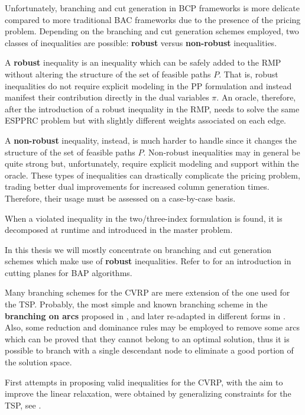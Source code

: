 \medskip

Unfortunately, branching and cut generation in BCP frameworks is more delicate compared to more traditional BAC frameworks due to the presence of the pricing problem.
Depending on the branching and cut generation schemes employed, two classes of inequalities are possible: \textbf{robust} versus \textbf{non-robust} inequalities.

A \textbf{robust} inequality is an inequality which can be safely added to the RMP without altering the structure of the set of feasible paths $P$.
That is, robust inequalities do not require explicit modeling in the PP formulation and instead manifest their contribution directly in the dual variables $\pi$.
An oracle, therefore, after the introduction of a robust inequality in the RMP, needs to solve the same ESPPRC problem but with slightly different weights associated on each edge.

A \textbf{non-robust} inequality, instead, is much harder to handle since it changes the structure of the set of feasible paths $P$.
Non-robust inequalities may in general be quite strong but, unfortunately, require explicit modeling and support within the oracle.
These types of inequalities can drastically complicate the pricing problem, trading better dual improvements for increased column generation times.
Therefore, their usage must be assessed on a case-by-case basis.

When a violated inequality in the two/three-index formulation is found, it is decomposed at runtime and introduced in the master problem.

In this thesis we will mostly concentrate on branching and cut generation schemes which make use of \textbf{robust} inequalities.
Refer to \textcite{desaulniers2011} for an introduction in cutting planes for BAP algorithms.

Many branching schemes for the CVRP are mere extension of the one used for the TSP.
Probably, the most simple and known branching scheme in the \textbf{branching on arcs} proposed in \textcite{christofides1969a},
and later re-adapted in different forms in \textcite{fisher1994a, miller1995}.
Also, some reduction and dominance rules may be employed to remove some arcs
which can be proved that they cannot belong to an optimal solution,
thus it is possible to branch with a single descendant node to eliminate
a good portion of the solution space.


First attempts in proposing valid inequalities for the CVRP,
with the aim to improve the linear relaxation,
were obtained by generalizing constraints for the TSP, see \textcite{naddef1993}.

